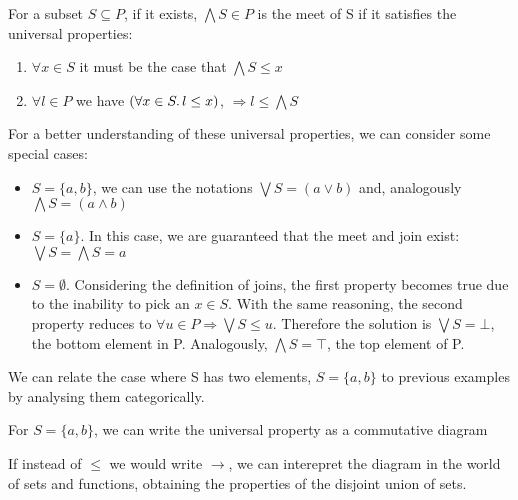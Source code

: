 \begin{definition}[Meets]
\label{defmeets}
    For a subset $S \subseteq P$, if it exists, $\bigwedge S \in P$ is the meet
    of S if it satisfies the universal properties:
    \begin{enumerate}
    \item $\forall x \in S$ it must be the case that $ \bigwedge S \leq x$
    \item $\forall l \in P$ we have $(\forall x \in S \ldotp l \leq x)$, $
      \Rightarrow l \leq \bigwedge S$
    \end{enumerate}
\end{definition}
For a better understanding of these universal properties, we can consider some
special cases:
\begin{itemize}
\item $S = \{a, b\}$, we can use the notations $\bigvee S = (a \vee b)$ and,
  analogously $\bigwedge S = (a \wedge b)$
\item $S = \{a\}$. In this case, we are guaranteed that the meet and join exist:
  $\bigvee S = \bigwedge S = a$
\item $S = \emptyset$. Considering the definition of joins, the first property
  becomes true due to the inability to pick an $x \in S$. With the same
  reasoning, the second property reduces to $\forall u \in P \Rightarrow \bigvee
  S \leq u$. Therefore the solution is $\bigvee S = \bot$, the bottom element in
  P. Analogously, $\bigwedge S = \top$, the top element of P.
\end{itemize}

We can relate the case where S has two elements, $S = \{a, b\}$ to previous
examples by analysing them categorically.

For $S = \{a, b\}$, we can write the universal property as a commutative diagram

\begin{center}
\end{center}

If instead of $\leq$ we would write $\rightarrow$, we can interepret the
diagram in the world of sets and functions, obtaining the properties of the
disjoint union of sets.

